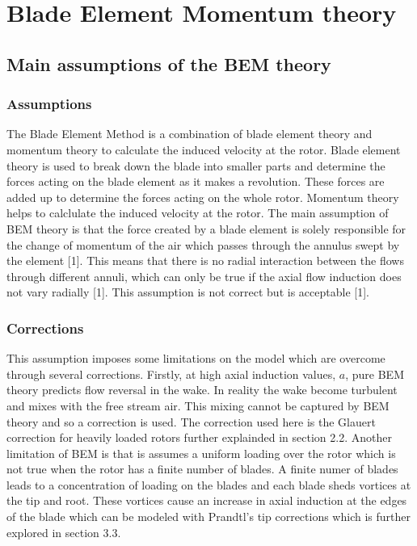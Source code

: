 \chapter{Blade Element Momentum theory}

\section{Main assumptions of the BEM theory}
\subsection{Assumptions}
The Blade Element Method is a combination of blade element theory and momentum theory to calculate the induced velocity at the rotor. Blade element theory is used to break down the blade into smaller parts and determine the forces acting on the blade element as it makes a revolution. These forces are added up to determine the forces acting on the whole rotor. Momentum theory helps to calclulate the induced velocity at the rotor. The main assumption of BEM theory is that the force created by a blade element is solely responsible for the change of momentum of the air which passes through the annulus swept by the element [1]. This means that there is no radial interaction between the flows through different annuli, which can only be true if the axial flow induction does not vary radially [1]. This assumption is not correct but is acceptable [1].
\subsection{Corrections}
This assumption imposes some limitations on the model which are overcome through several corrections. Firstly, at high axial induction values, $a$, pure BEM theory predicts flow reversal in the wake. In reality the wake become turbulent and mixes with the free stream air. This mixing cannot be captured by BEM theory and so a correction is used. The correction used here is the Glauert correction for heavily loaded rotors further explainded in section 2.2. Another limitation of BEM is that is assumes a uniform loading over the rotor which is not true when the rotor has a finite number of blades. A finite numer of blades leads to a concentration of loading on the blades and each blade sheds vortices at the tip and root. These vortices cause an increase in axial induction at the edges of the blade which can be modeled with Prandtl's tip corrections which is further explored in section 3.3.

